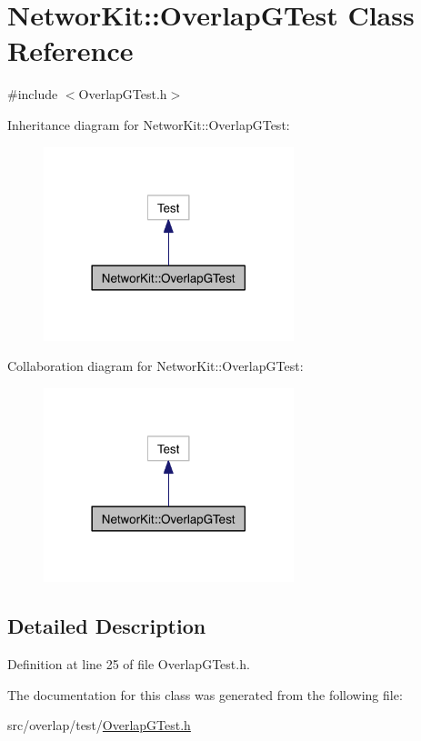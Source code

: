 \hypertarget{class_networ_kit_1_1_overlap_g_test}{\section{Networ\-Kit\-:\-:Overlap\-G\-Test Class Reference}
\label{class_networ_kit_1_1_overlap_g_test}
}


{\ttfamily \#include $<$Overlap\-G\-Test.\-h$>$}



Inheritance diagram for Networ\-Kit\-:\-:Overlap\-G\-Test\-:\nopagebreak
\begin{figure}[H]
\begin{center}
\leavevmode
\includegraphics[width=206pt]{class_networ_kit_1_1_overlap_g_test__inherit__graph}
\end{center}
\end{figure}


Collaboration diagram for Networ\-Kit\-:\-:Overlap\-G\-Test\-:\nopagebreak
\begin{figure}[H]
\begin{center}
\leavevmode
\includegraphics[width=206pt]{class_networ_kit_1_1_overlap_g_test__coll__graph}
\end{center}
\end{figure}


\subsection{Detailed Description}


Definition at line 25 of file Overlap\-G\-Test.\-h.



The documentation for this class was generated from the following file\-:\begin{DoxyCompactItemize}
\item 
src/overlap/test/\hyperlink{_overlap_g_test_8h}{Overlap\-G\-Test.\-h}\end{DoxyCompactItemize}
